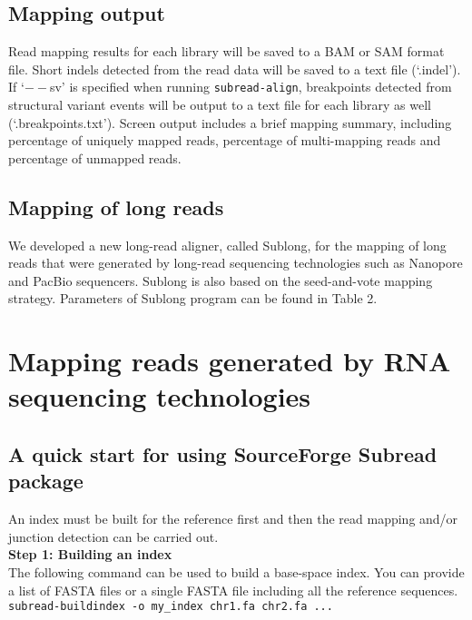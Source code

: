 \documentclass[12pt]{report}
\newcommand{\code}[1]{{\small\texttt{#1}}}
\newcommand{\Subread}{\textsf{Subread}}
\newcommand{\Sublong}{\textsf{Sublong}}
\begin{document}
\section{Mapping output}

Read mapping results for each library will be saved to a BAM or SAM format file.
Short indels detected from the read data will be saved to a text file (`.indel').
If `$--$sv' is specified when running \code{subread-align}, breakpoints detected from structural variant events will be output to a text file for each library as well (`.breakpoints.txt').
Screen output includes a brief mapping summary, including percentage of uniquely mapped reads, percentage of multi-mapping reads and percentage of unmapped reads.


\section{Mapping of long reads}

We developed a new long-read aligner, called {\Sublong}, for the mapping of long reads that were generated by long-read sequencing technologies such as Nanopore and PacBio sequencers.
{\Sublong} is also based on the seed-and-vote mapping strategy.
Parameters of {\Sublong} program can be found in Table 2.

\newpage


\chapter{Mapping reads generated by RNA sequencing technologies}

\section{A quick start for using SourceForge {\Subread} package}

\label{sec:rnaseq-subread}
An index must be built for the reference first and then the read mapping and/or junction detection can be carried out.\\

{\noindent\bf Step 1: Building an index}\\

\noindent The following command can be used to build a base-space index.
You can provide a list of FASTA files or a single FASTA file including all the reference sequences.\\

\code{subread-buildindex -o my\_index chr1.fa chr2.fa ...}\\
\end{document}
